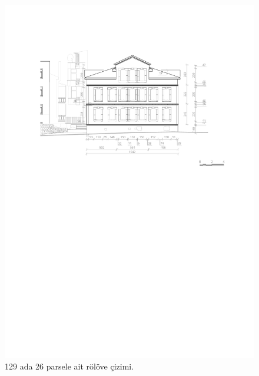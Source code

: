 \begin{figure}
\centering
\includegraphics[width=1\textwidth,height=\textheight]{source/figures/Roloveler/R129-26.pdf}
\caption{129 ada 26 parsele ait rölöve çizimi.}
\end{figure}

